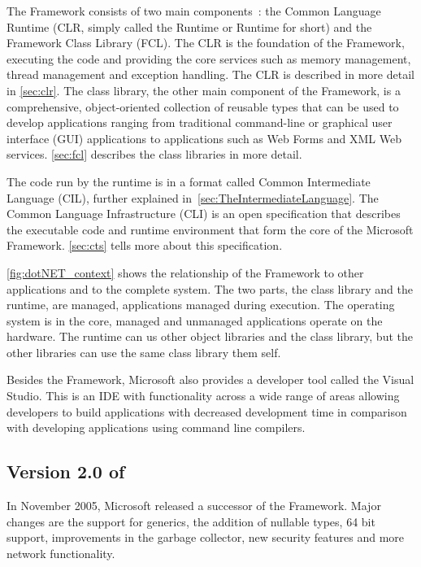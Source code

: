%
%
%
%
%
The \dotNET Framework consists of two main components~\cite{Microsoft03-1}: the Common Language Runtime (CLR, simply called the \dotNET Runtime or Runtime for short) and the \dotNET Framework Class Library (FCL). 
The CLR is the foundation of the \dotNET Framework, executing the code and providing the core services such as memory management, thread management and exception handling. The CLR is described in more detail in \autoref{sec:clr}.
The class library, the other main component of the \dotNET Framework, is a comprehensive, object-oriented collection of reusable types that can be used to develop applications ranging from traditional command-line or graphical user interface (GUI) applications to applications such as Web Forms and XML Web services. \autoref{sec:fcl} describes the class libraries in more detail.

The code run by the runtime is in a format called Common Intermediate Language (CIL), further explained in~\autoref{sec:TheIntermediateLanguage}. The Common Language Infrastructure (CLI) is an open specification that describes the executable code and runtime environment that form the core of the Microsoft \dotNET Framework. \autoref{sec:cts} tells more about this specification.

\autoref{fig:dotNET_context} shows the relationship of the \dotNET Framework to other applications and to the complete system. The two parts, the class library and the runtime, are managed, \ie applications managed during execution. The operating system is in the core, managed and unmanaged applications operate on the hardware. The runtime can us other object libraries and the class library, but the other libraries can use the same class library them self.

Besides the Framework, Microsoft also provides a developer tool called the Visual Studio. This is an IDE with functionality across a wide range of areas allowing developers to build applications with decreased development time in comparison with developing applications using command line compilers.

\subsection{Version 2.0 of \dotNET}
\label{sec:Version2}
In November 2005, Microsoft released a successor of the \dotNET Framework. 
Major changes are the support for generics, the addition of nullable types, 64 bit support, improvements in the garbage collector, new security features and more network functionality.

